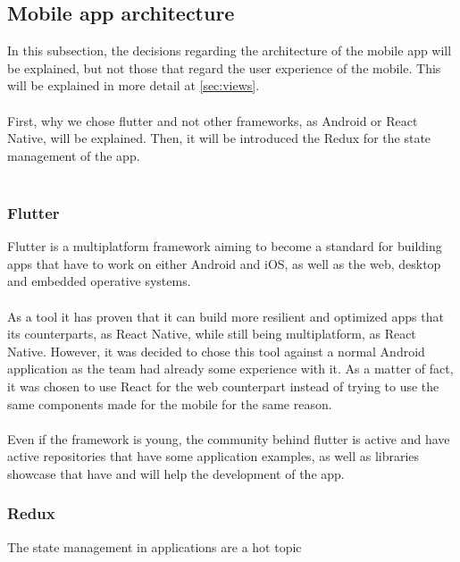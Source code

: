 \documentclass[./main.tex]{subfiles}
\begin{document}
	\subsection{Mobile app architecture}
	In this subsection, the decisions regarding the architecture of the mobile app will
	be explained, but not those that regard the user experience of the mobile. This 
	will be explained in more detail at  \ref{sec:views}.\\
	\\
	First, why we chose flutter and not other frameworks, as Android or React Native,
	will be explained. Then, it will be introduced the Redux for the state management
	of the app.\\
	\\
	\subsubsection{Flutter}
	Flutter is a multiplatform framework aiming to become a standard for building apps
	that have to work on either Android and iOS, as well as the web, desktop and embedded 
	operative systems. \\
	\\
	As a tool it has proven that it can build more resilient and optimized apps that its counterparts, 
	as React Native, while still being multiplatform, as React Native. However, it was decided to
	chose this tool against a normal Android application as the team had already some experience
	with it. As a matter of fact, it was chosen to use React for the web counterpart instead of trying 
	to use the same components made for the mobile for the same reason.\\
	\\
	Even if the framework is young, the community behind flutter is active and have active repositories
	that have some application examples, as well as libraries showcase that have and will help
	the development of the app.
	\subsubsection{Redux}
	The state management in applications are a hot topic 
	
\end{document}
